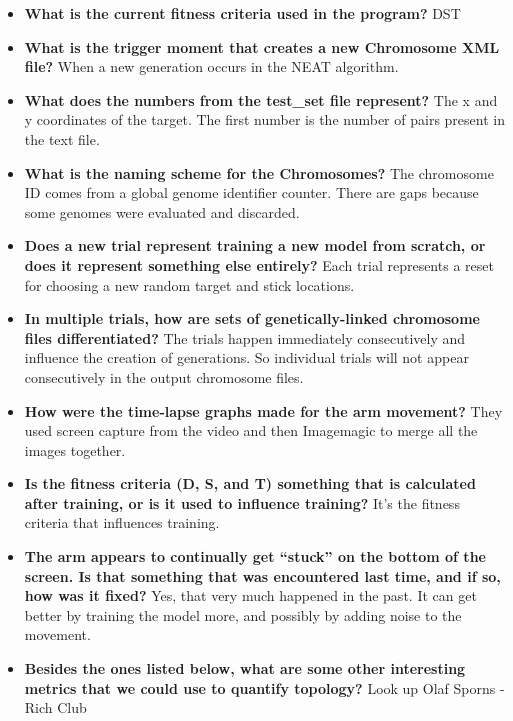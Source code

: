 \documentclass{article}
\begin{document}
\begin{itemize}
    \item \textbf{What is the current fitness criteria used in the program?} DST
    
    \item \textbf{What is the trigger moment that creates a new Chromosome XML file?} When a new generation occurs in the NEAT algorithm.

    \item \textbf{What does the numbers from the test\_set file represent?} The x and y coordinates of the target. The first number is the number of pairs present in the text file.

    \item \textbf{What is the naming scheme for the Chromosomes?} The chromosome ID comes from a global genome identifier counter. There are gaps because some genomes were evaluated and discarded.

        \item \textbf{Does a new trial represent training a new model from scratch, or does it represent something else entirely?} Each trial represents a reset for choosing a new random target and stick locations. 
    
    \item \textbf{In multiple trials, how are sets of genetically-linked chromosome files differentiated?} The trials happen immediately consecutively and influence the creation of generations. So individual trials will not appear consecutively in the output chromosome files.

    \item \textbf{How were the time-lapse graphs made for the arm movement?} They used screen capture from the video and then Imagemagic to merge all the images together.

    \item \textbf{Is the fitness criteria (D, S, and T) something that is calculated after training, or is it used to influence training?} It's the fitness criteria that influences training.

    \item \textbf{The arm appears to continually get “stuck” on the bottom of the screen. Is that something that was encountered last time, and if so, how was it fixed?} Yes, that very much happened in the past. It can get better by training the model more, and possibly by adding noise to the movement.

    \item \textbf{Besides the ones listed below, what are some other interesting metrics that we could use to quantify topology?} Look up Olaf Sporns - Rich Club


\end{itemize}
\end{document}
